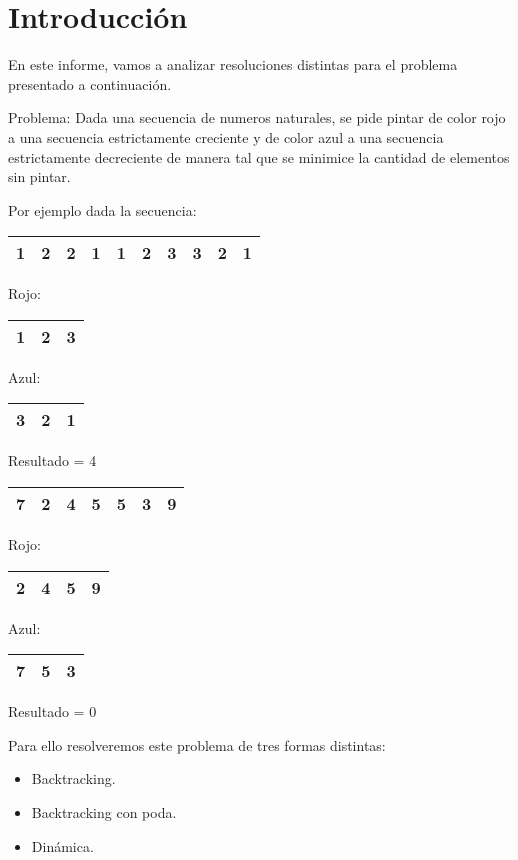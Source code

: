 \section{Introducción}

En este informe, vamos a analizar resoluciones distintas para el problema presentado a continuación.

Problema: Dada una secuencia de numeros naturales, se pide  pintar de color rojo a una secuencia estrictamente creciente y de color azul a una secuencia estrictamente decreciente
de manera tal que se minimice la cantidad de elementos sin pintar.

Por ejemplo dada la secuencia:
\begin{flushleft}
  \begin{tabular}{ | l | c | r | l | c | r | l | c | r | l |}
    \hline
1 & 2 & 2 & 1 & 1 & 2 & 3 & 3 & 2 & 1\\ \hline
  \end{tabular}
\newline
Rojo:
\newline
  \begin{tabular}{ | l | c | r |}
    \hline
    1 & 2 & 3 \\ \hline
  \end{tabular}
 \newline
  Azul:
  \newline
  \begin{tabular}{ | l | c | r |}
    \hline
    3 & 2 & 1 \\ \hline
  \end{tabular}
  \newline
Resultado = 4
\vspace*{5mm}
\newline
  \begin{tabular}{ | l | c | r | l | c | r | l |}
    \hline
7 & 2 & 4 & 5 & 5 & 3 & 9\\ \hline
  \end{tabular}
\newline
Rojo:
\newline
  \begin{tabular}{ | l | c | r | r |}
    \hline
    2 & 4 & 5 & 9\\ \hline
  \end{tabular}
 \newline
  Azul:
  \newline
  \begin{tabular}{ | l | c | r |}
    \hline
    7 & 5 & 3 \\ \hline
  \end{tabular}
  \newline
Resultado = 0

\vspace*{5mm}

Para ello resolveremos este problema de tres formas distintas:

\vspace*{5mm}
\begin{itemize}
    \item Backtracking.
    \item Backtracking con poda.
    \item Dinámica.
\end{itemize}

\end{flushleft}
